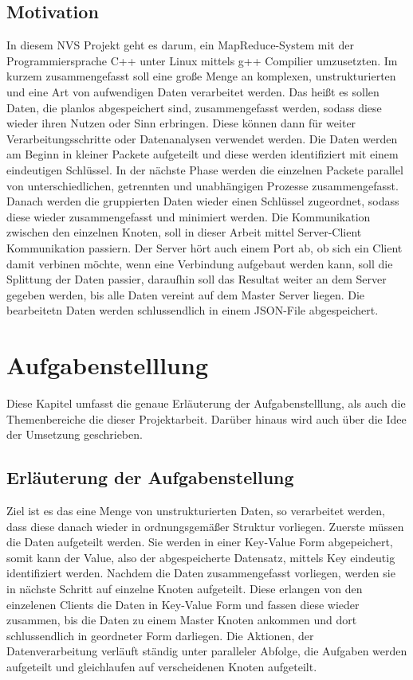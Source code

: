 \documentclass[a4paper,12pt]{article}
\begin{document}
\subsection{Motivation}
In diesem NVS Projekt geht es darum, ein MapReduce-System mit der Programmiersprache C++ unter Linux mittels g++ Compilier umzusetzten.
Im kurzem zusammengefasst soll eine große Menge an komplexen, unstrukturierten und eine Art von aufwendigen Daten verarbeitet werden. 
Das heißt es sollen Daten, die planlos abgespeichert sind, zusammengefasst werden, sodass diese wieder ihren Nutzen oder Sinn erbringen. Diese können
dann für weiter Verarbeitungsschritte oder Datenanalysen verwendet werden. Die Daten werden am Beginn in kleiner Packete aufgeteilt und diese werden identifiziert mit einem eindeutigen
Schlüssel. In der nächste Phase werden die einzelnen Packete parallel von unterschiedlichen, getrennten und unabhängigen Prozesse zusammengefasst. Danach werden die gruppierten Daten wieder 
einen Schlüssel zugeordnet, sodass diese wieder zusammengefasst und minimiert werden. Die Kommunikation zwischen den einzelnen Knoten, soll in dieser Arbeit mittel Server-Client Kommunikation passiern.
Der Server hört auch einem Port ab, ob sich ein Client damit verbinen möchte, wenn eine Verbindung aufgebaut werden kann, soll die Splittung der Daten passier, daraufhin soll das Resultat weiter an dem Server gegeben werden, bis 
alle Daten vereint auf dem Master Server liegen. Die bearbeitetn Daten werden schlussendlich in einem JSON-File abgespeichert.
\section{Aufgabenstelllung}
Diese Kapitel umfasst die genaue Erläuterung der Aufgabenstelllung, als auch die Themenbereiche die dieser Projektarbeit. Darüber hinaus wird auch über die Idee der Umsetzung geschrieben.

\subsection{Erläuterung der Aufgabenstellung}
Ziel ist es das eine Menge von unstrukturierten Daten, so verarbeitet werden, dass diese danach wieder in ordnungsgemäßer Struktur vorliegen. Zuerste müssen die Daten aufgeteilt werden. Sie werden in einer Key-Value Form abgepeichert, somit kann
der Value, also der abgespeicherte Datensatz, mittels Key eindeutig identifiziert werden. Nachdem die Daten zusammengefasst vorliegen, werden sie in nächste Schritt auf einzelne Knoten aufgeteilt. Diese erlangen von den einzelenen Clients die Daten in Key-Value Form und fassen diese wieder zusammen, bis die Daten zu einem Master Knoten ankommen und dort schlussendlich in geordneter Form darliegen.
Die Aktionen, der Datenverarbeitung verläuft ständig unter paralleler Abfolge, die Aufgaben werden aufgeteilt und gleichlaufen auf verscheidenen Knoten aufgeteilt.
\end{document}
